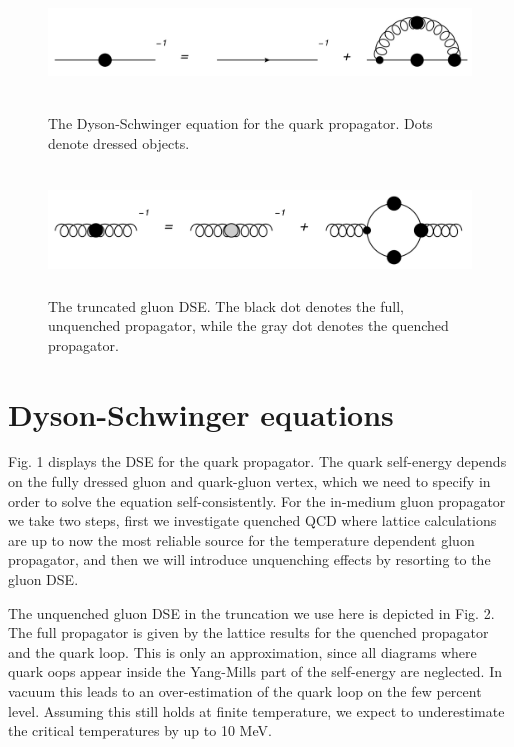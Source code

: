 \documentclass[a4paper,fleqn]{cas-dc}
\begin{document}
	\begin{figure}
	\centering
	\includegraphics[width=\textwidth,height=1.4in]{fig1.png}
	\caption{The Dyson-Schwinger equation for the quark propagator. Dots denote dressed objects.}
	\label{FIG:1}
\end{figure}
\begin{figure}
	\centering
	\includegraphics[width=\textwidth,height=1.3in]{fig2.png}
	\caption{The truncated gluon DSE. The black dot denotes the full, unquenched propagator, while the gray dot denotes the quenched propagator.}
	\label{FIG:2}
\end{figure}
\section{Dyson-Schwinger equations}
Fig. 1 displays the DSE for the quark propagator. The quark self-energy depends on the fully dressed gluon and quark-gluon vertex, which we need to specify in order to solve the equation self-consistently. For the in-medium gluon
propagator we take two steps, first we investigate quenched QCD where lattice calculations are up to now the most reliable
source for the temperature dependent gluon propagator, and then we will introduce unquenching effects by resorting to
the gluon DSE.

The unquenched gluon DSE in the truncation we use here is depicted in Fig. 2. The full propagator is given by the lattice
results for the quenched propagator and the quark loop. This is only an approximation, since all diagrams where quark
oops appear inside the Yang-Mills part of the self-energy are neglected. In vacuum this leads to an over-estimation of the
quark loop on the few percent level. Assuming this still holds at finite temperature, we expect to underestimate the critical
temperatures by up to 10 MeV.
\end{document}
